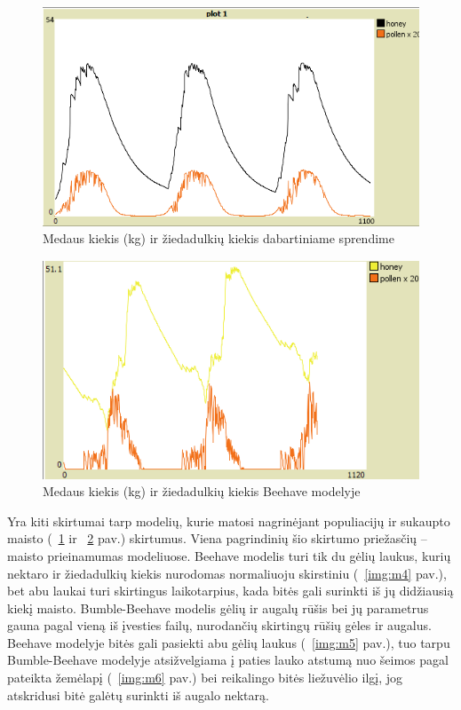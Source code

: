 \documentclass{VUMIFKompMagistrinis}
\begin{document}
\begin{figure}[H]
    \centering
    \includegraphics[scale=0.75]{img/mtd3/mtdp3v11-img002.png}
    \caption{Medaus kiekis (kg) ir žiedadulkių kiekis dabartiniame sprendime}
    \label{img:m2}
\end{figure}

\begin{figure}[H]
    \centering
    \includegraphics[scale=0.75]{img/mtd3/mtdp3v11-img003.png}
    \caption{Medaus kiekis (kg) ir žiedadulkių kiekis Beehave modelyje}
    \label{img:m3}
\end{figure}


	 Yra kiti skirtumai tarp modelių, kurie matosi nagrinėjant populiacijų ir sukaupto maisto (~\ref{img:m2} ir ~\ref{img:m3} pav.) skirtumus. Viena pagrindinių šio skirtumo priežasčių – maisto prieinamumas modeliuose. Beehave modelis turi tik du gėlių laukus, kurių nektaro ir žiedadulkių kiekis nurodomas normaliuoju skirstiniu (~\ref{img:m4} pav.), bet abu laukai turi skirtingus laikotarpius, kada bitės gali surinkti iš jų didžiausią kiekį maisto. Bumble-Beehave modelis gėlių ir augalų rūšis bei jų parametrus gauna pagal vieną iš įvesties failų, nurodančių skirtingų rūšių gėles ir augalus. Beehave modelyje bitės gali pasiekti abu gėlių laukus (~\ref{img:m5} pav.), tuo tarpu Bumble-Beehave modelyje atsižvelgiama į paties lauko atstumą nuo šeimos pagal pateikta žemėlapį (~\ref{img:m6} pav.) bei reikalingo bitės liežuvėlio ilgį, jog atskridusi bitė galėtų surinkti iš augalo nektarą.
\end{document}
